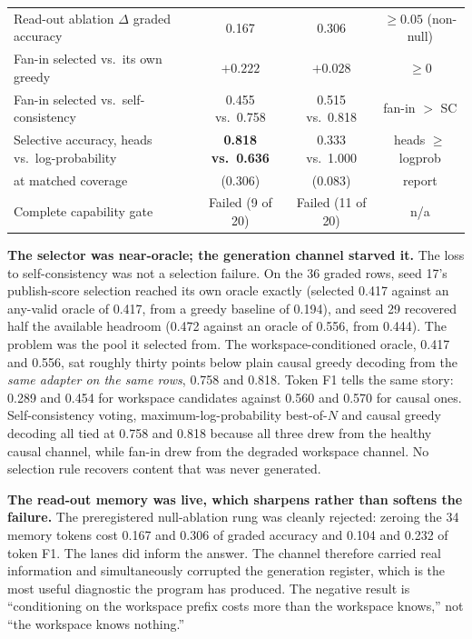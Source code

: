 \documentclass[10pt,a4paper]{article}
\newcommand{\fail}[1]{\textcolor{failred}{#1}}
\newcommand{\good}[1]{\textcolor{okgreen}{#1}}
\begin{document}
\begin{table}[htbp]
\begin{tabularx}{\textwidth}{@{}Xccc@{}}
Read-out ablation $\Delta$ graded accuracy & \good{0.167} & \good{0.306} & $\ge 0.05$ (non-null) \\
Fan-in selected vs.\ its own greedy & \good{$+0.222$} & \good{$+0.028$} & $\ge 0$ \\
Fan-in selected vs.\ self-consistency & \fail{0.455 vs.\ 0.758} & \fail{0.515 vs.\ 0.818} & fan-in $>$ SC \\
Selective accuracy, heads vs.\ log-probability & \textbf{\good{0.818 vs.\ 0.636}} & \fail{0.333 vs.\ 1.000} & heads $\ge$ logprob \\
\quad at matched coverage & (0.306) & (0.083) & report \\
Complete capability gate & \fail{Failed (9 of 20)} & \fail{Failed (11 of 20)} & n/a \\
\bottomrule
\end{tabularx}
\end{table}

\textbf{The selector was near-oracle; the generation channel starved it.}
The loss to self-consistency was not a selection failure. On the 36 graded
rows, seed 17's publish-score selection reached its own oracle exactly
(selected 0.417 against an any-valid oracle of 0.417, from a greedy baseline
of 0.194), and seed 29 recovered half the available headroom (0.472 against
an oracle of 0.556, from 0.444). The problem was the pool it selected from.
The workspace-conditioned oracle, 0.417 and 0.556, sat roughly thirty points
below plain causal greedy decoding from the \emph{same adapter on the same
rows}, 0.758 and 0.818. Token F1 tells the same story: 0.289 and 0.454 for
workspace candidates against 0.560 and 0.570 for causal ones. Self-consistency
voting, maximum-log-probability best-of-$N$ and causal greedy decoding all
tied at 0.758 and 0.818 because all three drew from the healthy causal
channel, while fan-in drew from the degraded workspace channel. No selection
rule recovers content that was never generated.

\textbf{The read-out memory was live, which sharpens rather than softens the
failure.} The preregistered null-ablation rung was cleanly rejected: zeroing
the 34 memory tokens cost 0.167 and 0.306 of graded accuracy and 0.104 and
0.232 of token F1. The lanes did inform the answer. The channel therefore
carried real information and simultaneously corrupted the generation
register, which is the most useful diagnostic the program has produced. The
negative result is ``conditioning on the workspace prefix costs more than the
workspace knows,'' not ``the workspace knows nothing.''
\end{document}
